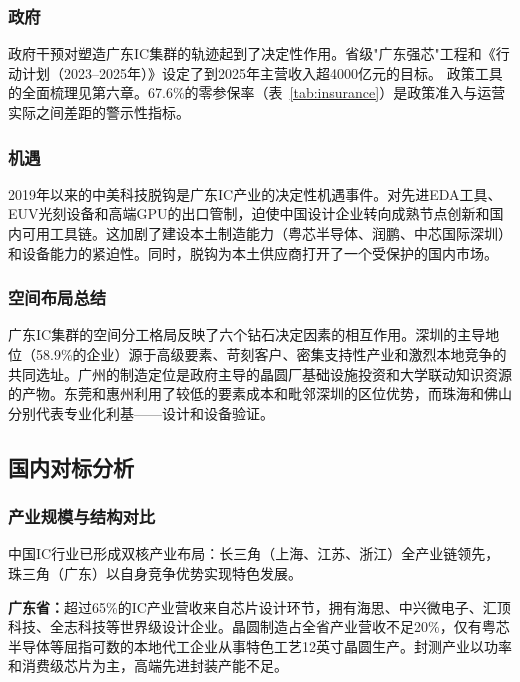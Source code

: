 \documentclass[12pt,a4paper]{article}
\begin{document}
\subsubsection{政府}

政府干预对塑造广东IC集群的轨迹起到了决定性作用。省级"广东强芯"工程和《行动计划（2023--2025年）》设定了到2025年主营收入超4000亿元的目标。
政策工具的全面梳理见第六章。67.6\%的零参保率（表~\ref{tab:insurance}）是政策准入与运营实际之间差距的警示性指标。

\subsubsection{机遇}

2019年以来的中美科技脱钩是广东IC产业的决定性机遇事件。对先进EDA工具、EUV光刻设备和高端GPU的出口管制，迫使中国设计企业转向成熟节点创新和国内可用工具链。这加剧了建设本土制造能力（粤芯半导体、润鹏、中芯国际深圳）和设备能力的紧迫性。同时，脱钩为本土供应商打开了一个受保护的国内市场。

\subsubsection{空间布局总结}

广东IC集群的空间分工格局反映了六个钻石决定因素的相互作用。深圳的主导地位（58.9\%的企业）源于高级要素、苛刻客户、密集支持性产业和激烈本地竞争的共同选址。广州的制造定位是政府主导的晶圆厂基础设施投资和大学联动知识资源的产物。东莞和惠州利用了较低的要素成本和毗邻深圳的区位优势，而珠海和佛山分别代表专业化利基——设计和设备验证。

\subsection{国内对标分析}
\label{sec:domestic_comparison}

\subsubsection{产业规模与结构对比}

中国IC行业已形成双核产业布局：长三角（上海、江苏、浙江）全产业链领先，珠三角（广东）以自身竞争优势实现特色发展。

\textbf{广东省：}超过65\%的IC产业营收来自芯片设计环节，拥有海思、中兴微电子、汇顶科技、全志科技等世界级设计企业。晶圆制造占全省产业营收不足20\%，仅有粤芯半导体等屈指可数的本地代工企业从事特色工艺12英寸晶圆生产。封测产业以功率和消费级芯片为主，高端先进封装产能不足。
\end{document}
